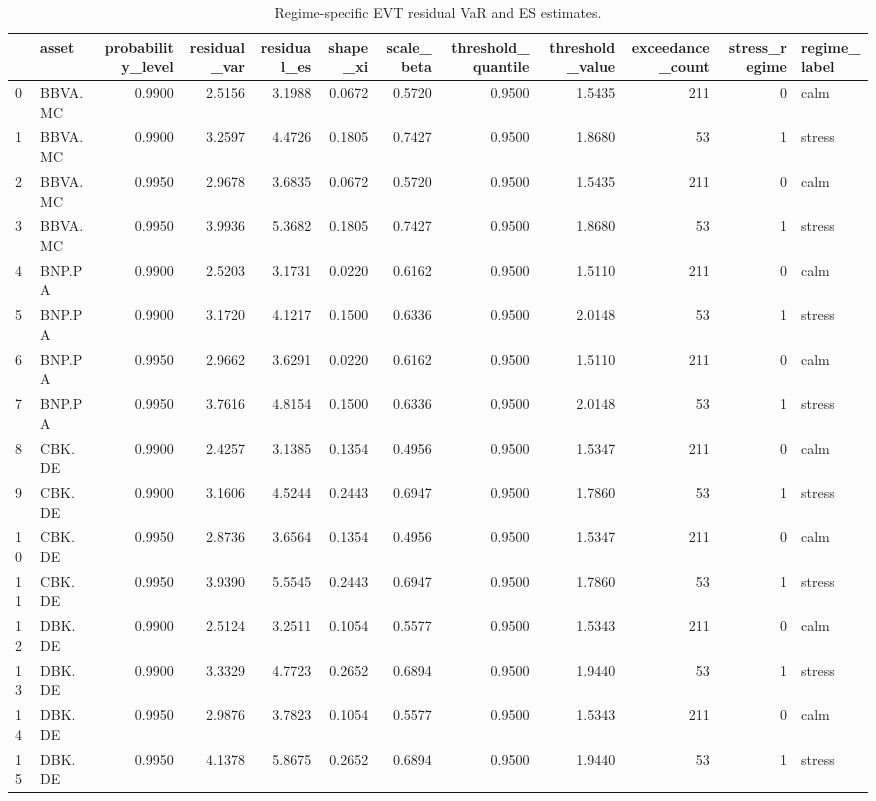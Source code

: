 \begin{table}
\caption{Regime-specific EVT residual VaR and ES estimates.}
\label{tab:evt_var_es_regime}
\begin{tabular}{llrrrrrrrrrl}
\toprule
 & asset & probability_level & residual_var & residual_es & shape_xi & scale_beta & threshold_quantile & threshold_value & exceedance_count & stress_regime & regime_label \\
\midrule
0 & BBVA.MC & 0.9900 & 2.5156 & 3.1988 & 0.0672 & 0.5720 & 0.9500 & 1.5435 & 211 & 0 & calm \\
1 & BBVA.MC & 0.9900 & 3.2597 & 4.4726 & 0.1805 & 0.7427 & 0.9500 & 1.8680 & 53 & 1 & stress \\
2 & BBVA.MC & 0.9950 & 2.9678 & 3.6835 & 0.0672 & 0.5720 & 0.9500 & 1.5435 & 211 & 0 & calm \\
3 & BBVA.MC & 0.9950 & 3.9936 & 5.3682 & 0.1805 & 0.7427 & 0.9500 & 1.8680 & 53 & 1 & stress \\
4 & BNP.PA & 0.9900 & 2.5203 & 3.1731 & 0.0220 & 0.6162 & 0.9500 & 1.5110 & 211 & 0 & calm \\
5 & BNP.PA & 0.9900 & 3.1720 & 4.1217 & 0.1500 & 0.6336 & 0.9500 & 2.0148 & 53 & 1 & stress \\
6 & BNP.PA & 0.9950 & 2.9662 & 3.6291 & 0.0220 & 0.6162 & 0.9500 & 1.5110 & 211 & 0 & calm \\
7 & BNP.PA & 0.9950 & 3.7616 & 4.8154 & 0.1500 & 0.6336 & 0.9500 & 2.0148 & 53 & 1 & stress \\
8 & CBK.DE & 0.9900 & 2.4257 & 3.1385 & 0.1354 & 0.4956 & 0.9500 & 1.5347 & 211 & 0 & calm \\
9 & CBK.DE & 0.9900 & 3.1606 & 4.5244 & 0.2443 & 0.6947 & 0.9500 & 1.7860 & 53 & 1 & stress \\
10 & CBK.DE & 0.9950 & 2.8736 & 3.6564 & 0.1354 & 0.4956 & 0.9500 & 1.5347 & 211 & 0 & calm \\
11 & CBK.DE & 0.9950 & 3.9390 & 5.5545 & 0.2443 & 0.6947 & 0.9500 & 1.7860 & 53 & 1 & stress \\
12 & DBK.DE & 0.9900 & 2.5124 & 3.2511 & 0.1054 & 0.5577 & 0.9500 & 1.5343 & 211 & 0 & calm \\
13 & DBK.DE & 0.9900 & 3.3329 & 4.7723 & 0.2652 & 0.6894 & 0.9500 & 1.9440 & 53 & 1 & stress \\
14 & DBK.DE & 0.9950 & 2.9876 & 3.7823 & 0.1054 & 0.5577 & 0.9500 & 1.5343 & 211 & 0 & calm \\
15 & DBK.DE & 0.9950 & 4.1378 & 5.8675 & 0.2652 & 0.6894 & 0.9500 & 1.9440 & 53 & 1 & stress \\

\end{tabular}
\end{table}
